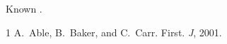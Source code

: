 \documentclass{article}
\begin{document}
Known \citetext{see \citealp{k1}}.
\begin{thebibliography}{1}
A.~Able, B.~Baker, and C.~Carr.
\newblock First.
\newblock \emph{J}, 2001.
\end{thebibliography}
\end{document}
